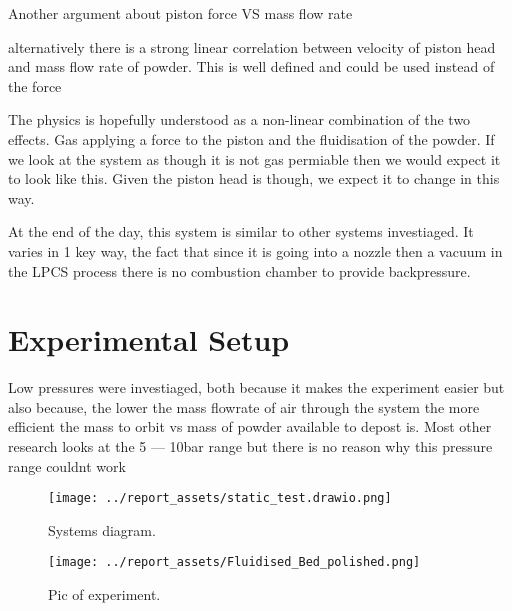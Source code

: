 
Another argument about piston force VS mass flow rate

alternatively there is a strong linear correlation between velocity of piston head and mass flow rate of powder. This is well defined and could be used instead of the force


The physics is hopefully understood as a non-linear combination of the two effects. Gas applying a force to the piston and the fluidisation of the powder. If we look at the system as though it is not gas permiable then we would expect it to look like this. Given the piston head is though, we expect it to change in this way.

At the end of the day, this system is similar to other systems investiaged. It varies in 1 key way, the fact that since it is going into a nozzle then a vacuum in the LPCS process there is no combustion chamber to provide backpressure.
\newpage
\section{Experimental Setup}
Low pressures were investiaged, both because it makes the experiment easier but also because, the lower the mass flowrate of air through the system the more efficient the mass to orbit vs mass of powder available to depost is. Most other research looks at the 5 — 10bar range but there is no reason why this pressure range couldnt work
\begin{figure}[htbp]
    \centering

    \begin{minipage}{0.95\textwidth}
        \centering
        \texttt{[image: ../report\_assets/static\_test.drawio.png]}
        \caption{Systems diagram.}\label{fig:systems-diagram}
    \end{minipage}
    \begin{minipage}{0.45\textwidth}
        \centering
        \texttt{[image: ../report\_assets/Fluidised\_Bed\_polished.png]}
        \caption{Pic of experiment.}\label{fig:experiment-image}
    \end{minipage}

\end{figure}


